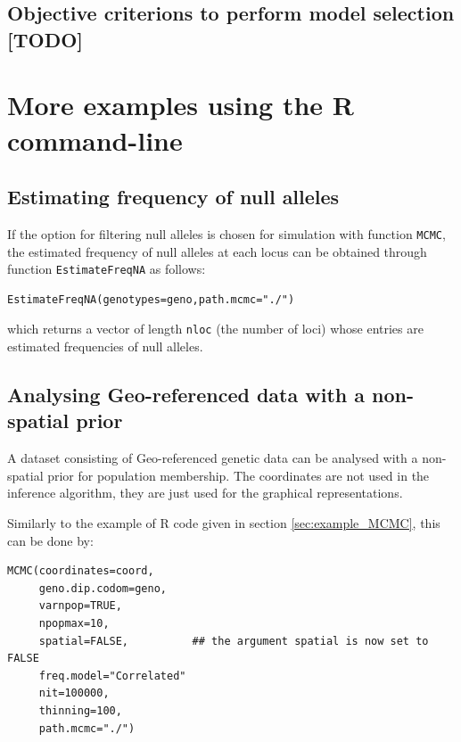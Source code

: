 \documentclass[a4paper,10pt]{article}
\begin{document}
\subsection{Objective criterions to perform model selection [TODO] }



\clearpage
\section[Command line examples]{More examples using the R command-line}\label{sec:more_example}


\subsection[Null alleles]{Estimating frequency of null alleles}

If the option for filtering null alleles is chosen for simulation with function \texttt{MCMC}, the estimated frequency of null alleles at each locus 
can be obtained through function \texttt{EstimateFreqNA} as follows:

\begin{verbatim}
EstimateFreqNA(genotypes=geno,path.mcmc="./")
\end{verbatim}



which returns  a vector of length \texttt{nloc} (the number of loci) whose entries
  are estimated frequencies of null alleles.



\subsection[Non-spatial prior]{Analysing Geo-referenced data with a non-spatial prior}

A dataset consisting of Geo-referenced genetic data can be analysed with a non-spatial prior for population membership. 
The coordinates are not used in the inference algorithm, they are just used for the graphical representations. 

Similarly to the example of R code given in section \ref{sec:example_MCMC}, this can be done by:

\begin{verbatim}
MCMC(coordinates=coord,
     geno.dip.codom=geno,
     varnpop=TRUE, 
     npopmax=10,
     spatial=FALSE,          ## the argument spatial is now set to FALSE
     freq.model="Correlated"
     nit=100000,
     thinning=100,
     path.mcmc="./")
\end{verbatim}
\end{document}
